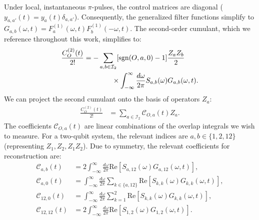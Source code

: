 \documentclass[%
 reprint,
superscriptaddress,
 amsmath,amssymb,
 aps,
pra,
floatfix,
]{revtex4-2}
\begin{document}
Under local, instantaneous $\pi$-pulses, the control matrices are diagonal ($y_{a,a'}(t) = y_a(t)\delta_{a,a'}$). Consequently, the generalized filter functions simplify to $G_{a,b}(\omega,t) = F^{(1)}_a(\omega,t)F^{(1)}_b(-\omega,t)$. The second-order cumulant, which we reference throughout this work, simplifies to:
\begin{align}
    \frac{C_{O}^{(2)}(t)}{2!}&=-\sum_{a,b\in\mathcal{I}_2}[\text{sgn}(O,a,0)-1]\frac{Z_aZ_b}{2}\notag\\
    &\qquad\qquad\times\int_{-\infty}^{\infty}\frac{d\omega}{2\pi}S_{a,b}(\omega)G_{a,b}(\omega,t).
\end{align}
We can project the second cumulant onto the basis of operators $Z_a$:
\begin{align}
    \frac{C_O^{(2)}(t)}{2!}&=\sum_{a\in\mathcal{I}_2}\mathcal{C}_{O,a}(t)Z_a.
\end{align}
The coefficients $\mathcal{C}_{O,a}(t)$ are linear combinations of the overlap integrals we wish to measure. For a two-qubit system, the relevant indices are $a,b \in \{1, 2, 12\}$ (representing $Z_1, Z_2, Z_1Z_2$). Due to symmetry, the relevant coefficients for reconstruction are:
\begin{align}\label{eq::coeff1}
    \mathcal{C}_{a,b}(t)&=2\int_{-\infty}^\infty \frac{d\omega}{2\pi}\text{Re}\left[S_{a,12}(\omega)G_{a,12}(\omega,t)\right],\\
    \mathcal{C}_{a,0}(t)&=\int_{-\infty}^\infty \frac{d\omega}{2\pi}\sum_{k\in \{a,12\}}\text{Re}\left[S_{k,k}(\omega)G_{k,k}(\omega,t)\right],\\
    \mathcal{C}_{12,0}(t)&=\int_{-\infty}^\infty \frac{d\omega}{2\pi}\sum_{k=1}^2\text{Re}\left[S_{k,k}(\omega)G_{k,k}(\omega,t)\right],\\
    \mathcal{C}_{12,12}(t)&=2\int_{-\infty}^\infty \frac{d\omega}{2\pi}\text{Re}\left[S_{1,2}(\omega)G_{1,2}(\omega,t)\right].\label{eq::coeff4}
\end{align}
\end{document}
